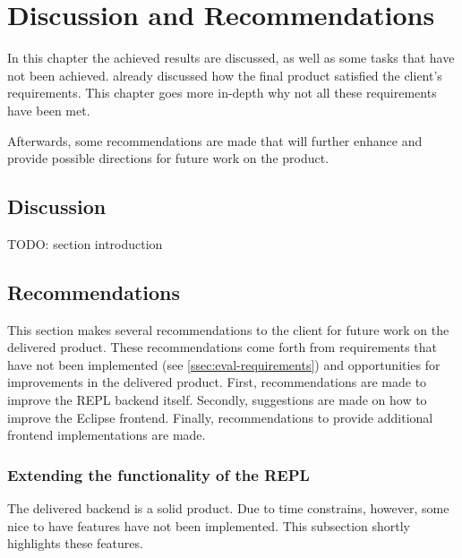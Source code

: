 \chapter{Discussion and Recommendations}
\label{cha:disc-recomm}

In this chapter the achieved results are discussed, as well as some tasks that
have not been achieved.  already discussed how the final
product satisfied the client's requirements. This chapter goes more in-depth why
not all these requirements have been met.

Afterwards, some recommendations are made that will further enhance and provide
possible directions for future work on the product.

\section{Discussion}
\label{sec:discuss-discussion}

TODO: section introduction



%

\section{Recommendations}
\label{sec:discuss-future}

This section makes several recommendations to the client for future work on the
delivered product. These recommendations come forth from requirements that have
not been implemented (see \cref{ssec:eval-requirements}) and opportunities for
improvements in the delivered product. First, recommendations are made to
improve the REPL backend itself. Secondly, suggestions are made on
how to improve the Eclipse frontend. Finally, recommendations to provide
additional frontend implementations are made.

\subsection{Extending the functionality of the REPL}
\label{ssec:impr-backend}

The delivered backend is a solid product. Due to time constrains, however, some
nice to have features have not been implemented. This subsection shortly
highlights these features.




